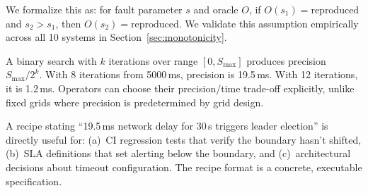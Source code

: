 We formalize this as: for fault parameter $s$ and oracle $O$, if $O(s_1) =
\text{reproduced}$ and $s_2 > s_1$, then $O(s_2) = \text{reproduced}$. We
validate this assumption empirically across all 10 systems in
Section~\ref{sec:monotonicity}.

 A binary search with $k$
iterations over range $[0, S_{\max}]$ produces precision $S_{\max}/2^k$. With
8 iterations from 5000\,ms, precision is 19.5\,ms. With 12 iterations, it is
1.2\,ms. Operators can choose their precision/time trade-off explicitly,
unlike fixed grids where precision is predetermined by grid design.

 A recipe stating
``19.5\,ms network delay for 30\,s triggers leader election'' is directly
useful for: (a)~CI regression tests that verify the boundary hasn't shifted,
(b)~SLA definitions that set alerting below the boundary, and (c)~architectural
decisions about timeout configuration. The recipe format is a concrete,
executable specification.
